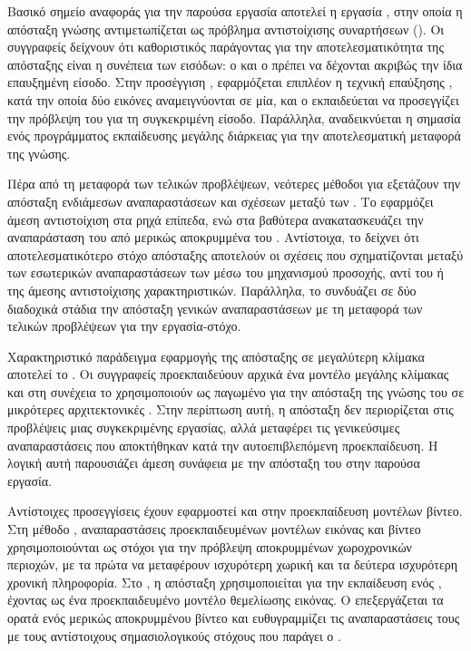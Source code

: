 Βασικό σημείο αναφοράς για την παρούσα εργασία αποτελεί η εργασία
\cite{beyer2022knowledge}, στην οποία η απόσταξη γνώσης αντιμετωπίζεται ως
πρόβλημα αντιστοίχισης συναρτήσεων (). Οι συγγραφείς
δείχνουν ότι καθοριστικός παράγοντας για την αποτελεσματικότητα της
απόσταξης είναι η συνέπεια των εισόδων: ο  και ο 
πρέπει να δέχονται ακριβώς την ίδια επαυξημένη είσοδο. Στην προσέγγιση
, εφαρμόζεται επιπλέον η τεχνική επαύξησης , κατά
την οποία δύο εικόνες αναμειγνύονται σε μία, και ο 
εκπαιδεύεται να προσεγγίζει την πρόβλεψη του  για τη
συγκεκριμένη είσοδο. Παράλληλα, αναδεικνύεται η σημασία ενός προγράμματος εκπαίδευσης μεγάλης
διάρκειας για την αποτελεσματική μεταφορά της γνώσης.

Πέρα από τη μεταφορά των τελικών προβλέψεων, νεότερες μέθοδοι για
 εξετάζουν την απόσταξη ενδιάμεσων
αναπαραστάσεων και σχέσεων μεταξύ των . Το 
\cite{yang2024vitkd} εφαρμόζει άμεση αντιστοίχιση στα ρηχά επίπεδα,
ενώ στα βαθύτερα ανακατασκευάζει την αναπαράσταση του  από
μερικώς αποκρυμμένα  του . Αντίστοιχα, το  \cite{ren2023tinymim} δείχνει ότι
αποτελεσματικότερο στόχο απόσταξης αποτελούν οι σχέσεις που σχηματίζονται
μεταξύ των εσωτερικών αναπαραστάσεων των  μέσω του μηχανισμού
προσοχής, αντί του  ή της άμεσης αντιστοίχισης
χαρακτηριστικών. Παράλληλα, το 
\cite{huang2023generic} συνδυάζει σε δύο διαδοχικά στάδια την απόσταξη γενικών
αναπαραστάσεων με τη μεταφορά των τελικών προβλέψεων για την
εργασία-στόχο.

Χαρακτηριστικό παράδειγμα εφαρμογής της απόσταξης σε μεγαλύτερη κλίμακα
αποτελεί το  \cite{oquab2023dinov2}. Οι συγγραφείς
προεκπαιδεύουν αρχικά ένα μοντέλο  μεγάλης κλίμακας και στη
συνέχεια το χρησιμοποιούν ως παγωμένο  για την απόσταξη της
γνώσης του σε μικρότερες αρχιτεκτονικές . Στην περίπτωση αυτή, η απόσταξη
δεν περιορίζεται στις προβλέψεις μιας συγκεκριμένης εργασίας, αλλά
μεταφέρει τις γενικεύσιμες αναπαραστάσεις που αποκτήθηκαν κατά την
αυτοεπιβλεπόμενη προεκπαίδευση. Η λογική αυτή παρουσιάζει άμεση
συνάφεια με την απόσταξη του  στην παρούσα εργασία.

Αντίστοιχες προσεγγίσεις έχουν εφαρμοστεί και στην προεκπαίδευση
μοντέλων βίντεο. Στη μέθοδο  \cite{wang2023mvd}, αναπαραστάσεις
προεκπαιδευμένων μοντέλων εικόνας και βίντεο χρησιμοποιούνται ως στόχοι
για την πρόβλεψη αποκρυμμένων χωροχρονικών περιοχών, με τα πρώτα να μεταφέρουν ισχυρότερη χωρική και τα δεύτερα ισχυρότερη
χρονική πληροφορία.
Στο  \cite{li2023unmasked}, η απόσταξη χρησιμοποιείται για την
εκπαίδευση ενός , έχοντας ως  ένα
προεκπαιδευμένο μοντέλο θεμελίωσης εικόνας. Ο 
επεξεργάζεται τα ορατά  ενός μερικώς αποκρυμμένου βίντεο και
ευθυγραμμίζει τις αναπαραστάσεις τους με τους αντίστοιχους
σημασιολογικούς στόχους που παράγει ο .

